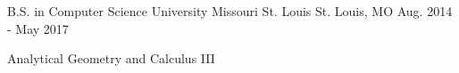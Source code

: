 

\begin{cventries}

  \cventry
    {B.S. in Computer Science} %
    {University Missouri St. Louis} %
    {St. Louis, MO} %
    {Aug. 2014 - May 2017} %
    {
      \begin{cvitems} %
        \item Analytical Geometry and Calculus III
      \end{cvitems}
    }
  \vspace{-5mm}
\end{cventries}
